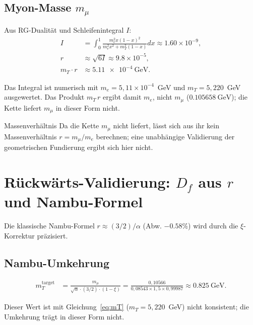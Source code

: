 	\subsection{Myon-Masse $m_{\mu}$}
	\label{subsec:myon_masse}
	
	Aus RG-Dualität und Schleifenintegral $I$:
	\begin{align}
		I &= \int_0^1 \frac{m_e^2 x (1-x)^2}{m_e^2 x^2 + m_T^2 (1-x)}  dx \approx 1.60 \times 10^{-9}, \label{eq:I} \\
		r &\approx \sqrt{6 I} \approx 9.8 \times 10^{-5}, \label{eq:r} \\
		m_T \cdot r &\approx \SI{5.11e-4}{\giga\electronvolt}. \label{eq:mmu}
	\end{align}

	Das Integral ist numerisch mit $m_e = 5{,}11\times10^{-4}$~GeV und $m_T = 5{,}220$~GeV ausgewertet. Das Produkt $m_T\,r$ ergibt damit $m_e$, nicht $m_\mu$ ($\SI{0.105658}{\giga\electronvolt}$); die Kette liefert $m_\mu$ in dieser Form nicht.
	
	\begin{important}{Massenverhältnis}{}
		Da die Kette $m_\mu$ nicht liefert, lässt sich aus ihr kein Massenverhältnis $r = m_{\mu} / m_e$ berechnen; eine unabhängige Validierung der geometrischen Fundierung ergibt sich hier nicht.
	\end{important}
	
	\section{Rückwärts-Validierung: $D_f$ aus $r$ und Nambu-Formel}
	\label{sec:rueckwaerts_validierung}
	
	Die klassische Nambu-Formel $r \approx (3/2)/\alpha$ (Abw. $-0.58\%$) wird durch die $\xi$-Korrektur präzisiert.
	
	\subsection{Nambu-Umkehrung}
	\label{subsec:nambu_umkehrung}
	
	\begin{align}
		m_T^{\text{target}} &= \frac{m_{\mu}}{\sqrt{\alpha} \cdot (3/2) \cdot (1 - \xi)} = \frac{0{,}10566}{0{,}08543\times1{,}5\times0{,}99987} \approx \SI{0.825}{\giga\electronvolt}. \label{eq:mTtarget}
	\end{align}

	Dieser Wert ist mit Gleichung~\eqref{eq:mT} ($m_T = 5{,}220$~GeV) nicht konsistent; die Umkehrung trägt in dieser Form nicht.
	
